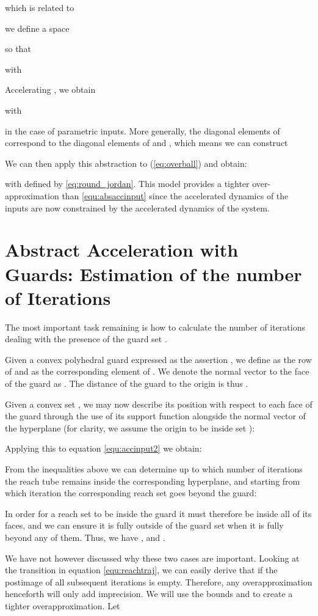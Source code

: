 \documentclass{IEEEtran}
\begin{document}
which is related to 

we define a space 

so that 

with 

Accelerating , we obtain 

with 

in the case of parametric inputs.  More generally, the diagonal elements of
 correspond to the diagonal elements of  and
,  which means we can construct

We can then apply this abstraction to (\ref{eq:overball}) and obtain:

with  defined by \eqref{eq:round_jordan}. 
This model provides a tighter over-approximation than \eqref{equ:absaccinput} since the accelerated dynamics of the inputs are now constrained by the accelerated dynamics of the system.

\section{Abstract Acceleration with Guards: Estimation of the number of Iterations} \label{sec:guards}


The most important task remaining is how to calculate the number of iterations dealing with the presence of the guard set . 

Given a convex polyhedral guard expressed as the assertion , 
we define  as the  row of  and  as the corresponding
element of . 
We denote the normal vector to the  face of the guard as .  
The distance of the guard to the origin is thus .

Given a convex set , we may now describe its position with respect to
each face of the guard through the use of its support function alongside the normal
vector of the hyperplane (for clarity, we assume the origin to be inside set ): 

Applying this to equation \eqref{equ:accinput2} we  obtain:


From the inequalities above we can determine up to which number of iterations  the reach tube remains inside the corresponding hyperplane, 
and starting from which iteration  the corresponding reach set goes beyond the guard:


In order for a reach set to be inside the guard it must therefore be inside
all of its faces, and we can ensure it is fully outside of the guard set
when it is fully beyond any of them.  Thus, we have , and .

We have not however discussed why these two cases are important. Looking at the transition in equation \eqref{equ:reachtraj}, we can easily derive that if  the postimage of all subsequent iterations is empty. Therefore, any overapproximation henceforth will only add imprecision. We will use the bounds  and  to create a tighter overapproximation.
Let 
\end{document}

